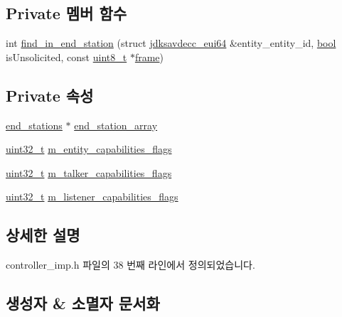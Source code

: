 \subsection*{Private 멤버 함수}
\begin{DoxyCompactItemize}
\item 
int \hyperlink{classavdecc__lib_1_1controller__imp_a9a0d332a5f7f7d1b006f83be7a9ee5e0}{find\+\_\+in\+\_\+end\+\_\+station} (struct \hyperlink{structjdksavdecc__eui64}{jdksavdecc\+\_\+eui64} \&entity\+\_\+entity\+\_\+id, \hyperlink{avb__gptp_8h_af6a258d8f3ee5206d682d799316314b1}{bool} is\+Unsolicited, const \hyperlink{stdint_8h_aba7bc1797add20fe3efdf37ced1182c5}{uint8\+\_\+t} $\ast$\hyperlink{gst__avb__playbin_8c_ac8e710e0b5e994c0545d75d69868c6f0}{frame})
\end{DoxyCompactItemize}
\subsection*{Private 속성}
\begin{DoxyCompactItemize}
\item 
\hyperlink{classavdecc__lib_1_1end__stations}{end\+\_\+stations} $\ast$ \hyperlink{classavdecc__lib_1_1controller__imp_a17c6518dbb728acdcd1c4e78d7bc1c5a}{end\+\_\+station\+\_\+array}
\item 
\hyperlink{parse_8c_a6eb1e68cc391dd753bc8ce896dbb8315}{uint32\+\_\+t} \hyperlink{classavdecc__lib_1_1controller__imp_a8c214e25ea6019cb80bcf63991f41064}{m\+\_\+entity\+\_\+capabilities\+\_\+flags}
\item 
\hyperlink{parse_8c_a6eb1e68cc391dd753bc8ce896dbb8315}{uint32\+\_\+t} \hyperlink{classavdecc__lib_1_1controller__imp_a769eb75aff04273040d83e41b29b2d9f}{m\+\_\+talker\+\_\+capabilities\+\_\+flags}
\item 
\hyperlink{parse_8c_a6eb1e68cc391dd753bc8ce896dbb8315}{uint32\+\_\+t} \hyperlink{classavdecc__lib_1_1controller__imp_aeec6be1aefd1fbc6a7d761abd14a5681}{m\+\_\+listener\+\_\+capabilities\+\_\+flags}
\end{DoxyCompactItemize}


\subsection{상세한 설명}


controller\+\_\+imp.\+h 파일의 38 번째 라인에서 정의되었습니다.



\subsection{생성자 \& 소멸자 문서화}
